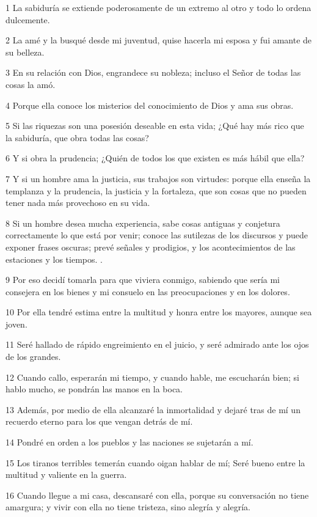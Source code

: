 \par 1 La sabiduría se extiende poderosamente de un extremo al otro y todo lo ordena dulcemente.
\par 2 La amé y la busqué desde mi juventud, quise hacerla mi esposa y fui amante de su belleza.
\par 3 En su relación con Dios, engrandece su nobleza; incluso el Señor de todas las cosas la amó.
\par 4 Porque ella conoce los misterios del conocimiento de Dios y ama sus obras.
\par 5 Si las riquezas son una posesión deseable en esta vida; ¿Qué hay más rico que la sabiduría, que obra todas las cosas?
\par 6 Y si obra la prudencia; ¿Quién de todos los que existen es más hábil que ella?
\par 7 Y si un hombre ama la justicia, sus trabajos son virtudes: porque ella enseña la templanza y la prudencia, la justicia y la fortaleza, que son cosas que no pueden tener nada más provechoso en su vida.
\par 8 Si un hombre desea mucha experiencia, sabe cosas antiguas y conjetura correctamente lo que está por venir; conoce las sutilezas de los discursos y puede exponer frases oscuras; prevé señales y prodigios, y los acontecimientos de las estaciones y los tiempos. .
\par 9 Por eso decidí tomarla para que viviera conmigo, sabiendo que sería mi consejera en los bienes y mi consuelo en las preocupaciones y en los dolores.
\par 10 Por ella tendré estima entre la multitud y honra entre los mayores, aunque sea joven.
\par 11 Seré hallado de rápido engreimiento en el juicio, y seré admirado ante los ojos de los grandes.
\par 12 Cuando callo, esperarán mi tiempo, y cuando hable, me escucharán bien; si hablo mucho, se pondrán las manos en la boca.
\par 13 Además, por medio de ella alcanzaré la inmortalidad y dejaré tras de mí un recuerdo eterno para los que vengan detrás de mí.
\par 14 Pondré en orden a los pueblos y las naciones se sujetarán a mí.
\par 15 Los tiranos terribles temerán cuando oigan hablar de mí; Seré bueno entre la multitud y valiente en la guerra.
\par 16 Cuando llegue a mi casa, descansaré con ella, porque su conversación no tiene amargura; y vivir con ella no tiene tristeza, sino alegría y alegría.
